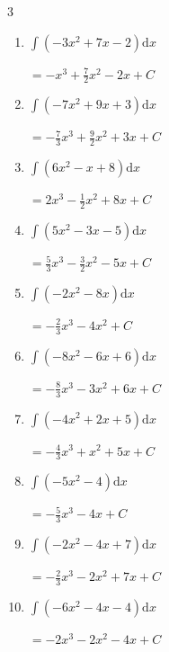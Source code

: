 \begin{multicols}{3}
\begin{enumerate}
        $\displaystyle =-\frac{5}{3}x^{3}+\frac{5}{2}x^{2}+9x+ C$

  \item $\displaystyle \int \left( -3x^{2}+7x-2 \right) \mathrm{d}x$

        $\displaystyle =-x^{3}+\frac{7}{2}x^{2}-2x+ C$

  \item $\displaystyle \int \left( -7x^{2}+9x+3 \right) \mathrm{d}x$

        $\displaystyle =-\frac{7}{3}x^{3}+\frac{9}{2}x^{2}+3x+ C$

  \item $\displaystyle \int \left( 6x^{2}-x+8 \right) \mathrm{d}x$

        $\displaystyle =2x^{3}-\frac{1}{2}x^{2}+8x+ C$

  \item $\displaystyle \int \left( 5x^{2}-3x-5 \right) \mathrm{d}x$

        $\displaystyle =\frac{5}{3}x^{3}-\frac{3}{2}x^{2}-5x+ C$

  \item $\displaystyle \int \left( -2x^{2}-8x \right) \mathrm{d}x$

        $\displaystyle =-\frac{2}{3}x^{3}-4x^{2}+ C$

  \item $\displaystyle \int \left( -8x^{2}-6x+6 \right) \mathrm{d}x$

        $\displaystyle =-\frac{8}{3}x^{3}-3x^{2}+6x+ C$

  \item $\displaystyle \int \left( -4x^{2}+2x+5 \right) \mathrm{d}x$

        $\displaystyle =-\frac{4}{3}x^{3}+x^{2}+5x+ C$

  \item $\displaystyle \int \left( -5x^{2}-4 \right) \mathrm{d}x$

        $\displaystyle =-\frac{5}{3}x^{3}-4x+ C$

  \item $\displaystyle \int \left( -2x^{2}-4x+7 \right) \mathrm{d}x$

        $\displaystyle =-\frac{2}{3}x^{3}-2x^{2}+7x+ C$

\columnbreak %

\resetques

  \item $\displaystyle \int \left( -6x^{2}-4x-4 \right) \mathrm{d}x$

        $\displaystyle =-2x^{3}-2x^{2}-4x+ C$


\end{enumerate}
\end{multicols}
